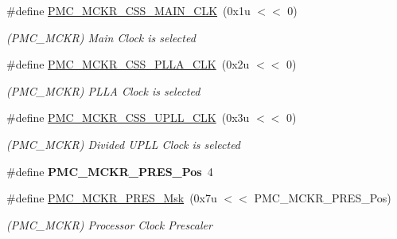 \begin{DoxyCompactItemize}
\#define \mbox{\hyperlink{group__SAME70__PMC_ga1083253fbc37fcfcc9aa078dbc35f067}{P\+M\+C\+\_\+\+M\+C\+K\+R\+\_\+\+C\+S\+S\+\_\+\+M\+A\+I\+N\+\_\+\+C\+LK}}~(0x1u $<$$<$ 0)
\begin{DoxyCompactList}\small\item\em (P\+M\+C\+\_\+\+M\+C\+KR) Main Clock is selected \end{DoxyCompactList}\item 
\mbox{\label{group__SAME70__PMC_ga87abdef35a28f8c1adc1167682ad875f}} 
\#define \mbox{\hyperlink{group__SAME70__PMC_ga87abdef35a28f8c1adc1167682ad875f}{P\+M\+C\+\_\+\+M\+C\+K\+R\+\_\+\+C\+S\+S\+\_\+\+P\+L\+L\+A\+\_\+\+C\+LK}}~(0x2u $<$$<$ 0)
\begin{DoxyCompactList}\small\item\em (P\+M\+C\+\_\+\+M\+C\+KR) P\+L\+LA Clock is selected \end{DoxyCompactList}\item 
\mbox{\label{group__SAME70__PMC_ga53f178db8b1b9ca8eaac6e2475ff1ec2}} 
\#define \mbox{\hyperlink{group__SAME70__PMC_ga53f178db8b1b9ca8eaac6e2475ff1ec2}{P\+M\+C\+\_\+\+M\+C\+K\+R\+\_\+\+C\+S\+S\+\_\+\+U\+P\+L\+L\+\_\+\+C\+LK}}~(0x3u $<$$<$ 0)
\begin{DoxyCompactList}\small\item\em (P\+M\+C\+\_\+\+M\+C\+KR) Divided U\+P\+LL Clock is selected \end{DoxyCompactList}\item 
\mbox{\label{group__SAME70__PMC_ga28624e80bd61898c81fad61c5f9e5991}} 
\#define {\bfseries P\+M\+C\+\_\+\+M\+C\+K\+R\+\_\+\+P\+R\+E\+S\+\_\+\+Pos}~4
\item 
\mbox{\label{group__SAME70__PMC_gadc14167dbb6ea635a41df3b41c8b9e84}} 
\#define \mbox{\hyperlink{group__SAME70__PMC_gadc14167dbb6ea635a41df3b41c8b9e84}{P\+M\+C\+\_\+\+M\+C\+K\+R\+\_\+\+P\+R\+E\+S\+\_\+\+Msk}}~(0x7u $<$$<$ P\+M\+C\+\_\+\+M\+C\+K\+R\+\_\+\+P\+R\+E\+S\+\_\+\+Pos)
\begin{DoxyCompactList}\small\item\em (P\+M\+C\+\_\+\+M\+C\+KR) Processor Clock Prescaler \end{DoxyCompactList}\item 
\mbox{\label{group__SAME70__PMC_ga53c450e13281ee4db86a15880bf31cb8}} 

\end{DoxyCompactItemize}
